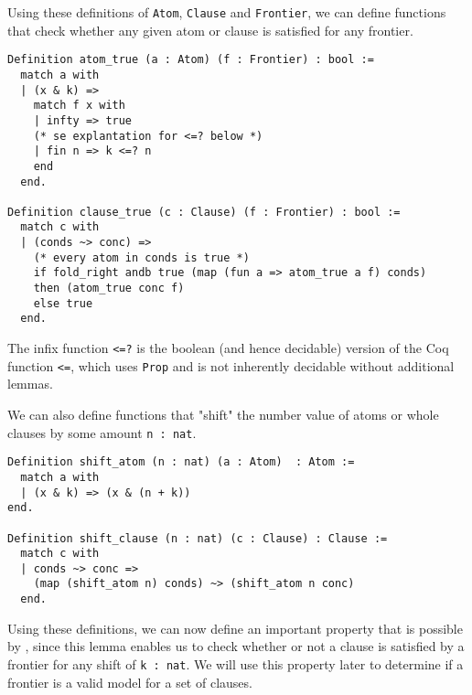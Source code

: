 Using these definitions of \lstinline{Atom}, \lstinline{Clause} and \lstinline{Frontier},
we can define functions that check whether any given atom or clause is satisfied for any frontier.

\begin{minipage}{\linewidth}
\begin{lstlisting}[language=Coq, label={lst:atom_clause_true_def}, caption={\lstinline{atom_true} and \lstinline{clause_true} in Coq}]
Definition atom_true (a : Atom) (f : Frontier) : bool :=
  match a with
  | (x & k) =>
    match f x with
    | infty => true
    (* se explantation for <=? below *)
    | fin n => k <=? n
    end
  end.

Definition clause_true (c : Clause) (f : Frontier) : bool :=
  match c with
  | (conds ~> conc) =>
    (* every atom in conds is true *)
    if fold_right andb true (map (fun a => atom_true a f) conds)
    then (atom_true conc f)
    else true
  end.
\end{lstlisting}
\end{minipage}

The infix function \lstinline{<=?} is the boolean (and hence decidable) version of the
Coq function \lstinline{<=}, which uses \lstinline{Prop} and is not inherently decidable without
additional lemmas.

We can also define functions that "shift" the number value of atoms or whole clauses by some amount \lstinline{n : nat}.

\begin{minipage}{\linewidth}
\begin{lstlisting}[language=Coq, label={lst:shift_atom_clause_true}, caption={\lstinline{shift_atom} and \lstinline{shift_clause} in Coq}]
Definition shift_atom (n : nat) (a : Atom)  : Atom :=
  match a with
  | (x & k) => (x & (n + k))
end.

Definition shift_clause (n : nat) (c : Clause) : Clause :=
  match c with
  | conds ~> conc =>
    (map (shift_atom n) conds) ~> (shift_atom n conc)
  end.
\end{lstlisting}
\end{minipage}

Using these definitions, we can now define an important property that is
possible by  \cite[p.~3]{mbezem}, since this lemma enables us to check whether or not a clause
is satisfied by a frontier for any shift of \lstinline{k : nat}.
We will use this property later to determine if a frontier is a valid model for a set of clauses.

